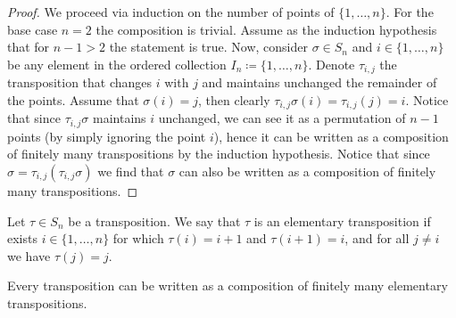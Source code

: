 \begin{proof}
We proceed via induction on the number of points of \(\{1, \dots, n\}\). For
the base case \(n = 2\) the composition is trivial. Assume as the induction
hypothesis that for \(n - 1 > 2\) the statement is true. Now, consider
\(\sigma \in S_n\) and \(i \in \{1, \dots, n\}\) be any element in
the ordered collection \(I_n \coloneq \{1, \dots, n\}\). Denote \(\tau_{i, j}\) the
transposition that changes \(i\) with \(j\) and maintains unchanged the
remainder of the points. Assume that \(\sigma(i) = j\), then clearly
\(\tau_{i, j} \sigma(i) = \tau_{i, j}(j) = i\). Notice that since \(\tau_{i,
j} \sigma\) maintains \(i\) unchanged, we can see it as a permutation of \(n
- 1\) points (by simply ignoring the point \(i\)), hence it can be written as
a composition of finitely many transpositions by the induction hypothesis.
Notice that since \(\sigma = \tau_{i, j} (\tau_{i, j} \sigma)\) we find that
\(\sigma\) can also be written as a composition of finitely many
transpositions.
\end{proof}

\begin{definition}
Let \(\tau \in S_n\) be a transposition. We say that \(\tau\) is an
elementary transposition if exists \(i \in \{1, \dots, n\}\) for which
\(\tau(i) = i + 1\) and \(\tau(i + 1) = i\), and for all \(j \neq i\) we have
\(\tau(j) = j\).
\end{definition}

\begin{proposition}
Every transposition can be written as a composition of finitely many
elementary transpositions.
\end{proposition}

